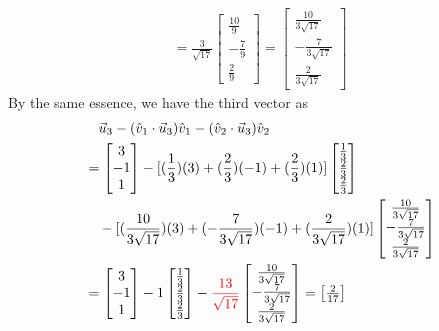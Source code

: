 \begin{solution}
\begin{align*}
=
\frac{3}{\sqrt{17}}
\begin{bmatrix}
\frac{10}{9} \\
-\frac{7}{9} \\
\frac{2}{9}
\end{bmatrix}
=
\begin{bmatrix}
\frac{10}{3\sqrt{17}} \\
-\frac{7}{3\sqrt{17}}\\
\frac{2}{3\sqrt{17}}
\end{bmatrix}
\end{align*}
By the same essence, we have the third vector as
\begin{align*}
&\quad \vec{u}_3 - (\hat{v}_1 \cdot \vec{u}_3)\hat{v}_1 - (\hat{v}_2 \cdot \vec{u}_3)\hat{v}_2\\
&=
\begin{bmatrix}
3 \\
-1 \\
1
\end{bmatrix}
-
[(\frac{1}{3})(3) + (\frac{2}{3})(-1) + (\frac{2}{3})(1)]
\begin{bmatrix}
\frac{1}{3} \\
\frac{2}{3} \\
\frac{2}{3}
\end{bmatrix} \\
&\quad -
[(\frac{10}{3\sqrt{17}})(3) + (-\frac{7}{3\sqrt{17}})(-1) + (\frac{2}{3\sqrt{17}})(1)]
\begin{bmatrix}
\frac{10}{3\sqrt{17}} \\
-\frac{7}{3\sqrt{17}} \\
\frac{2}{3\sqrt{17}}
\end{bmatrix} \\
&=
\begin{bmatrix}
3 \\
-1 \\
1
\end{bmatrix}
- 1
\begin{bmatrix}
\frac{1}{3} \\
\frac{2}{3} \\
\frac{2}{3}
\end{bmatrix}
-
\textcolor{red}{\frac{13}{\sqrt{17}}}
\begin{bmatrix}
\frac{10}{3\sqrt{17}} \\
-\frac{7}{3\sqrt{17}} \\
\frac{2}{3\sqrt{17}}
\end{bmatrix}
=
\begin{bmatrix}
\frac{2}{17} \\

\end{bmatrix}
\end{align*}
\end{solution}
